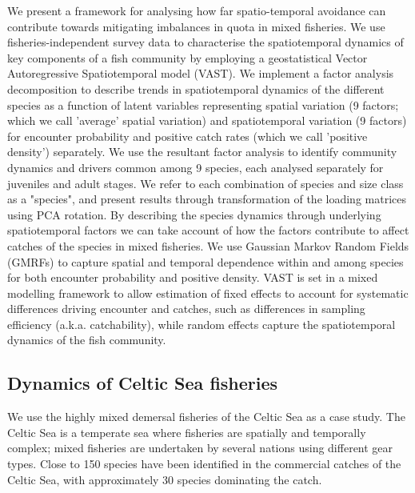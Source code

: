 \documentclass[fleqn,10pt]{wlscirep}
\begin{document}
\begin{linenumbers}
We present a framework for analysing how far spatio-temporal avoidance can
contribute towards mitigating imbalances in quota in mixed fisheries. We use
fisheries-independent survey data to characterise the spatiotemporal dynamics
of key components of a fish community by employing a geostatistical Vector
Autoregressive Spatiotemporal model (VAST). We implement a factor analysis
decomposition to describe trends in spatiotemporal dynamics of the different
species as a function of latent variables\cite{Thorson2015} representing
spatial variation (9 factors; which we call 'average' spatial variation) and
spatiotemporal variation (9 factors) for encounter probability and positive
catch rates (which we call 'positive density') separately\cite{Thorson2015a}.
We use the resultant factor analysis to identify community dynamics and drivers
common among 9 species, each analysed separately for juveniles and adult
stages.  We refer to each combination of species and size class as a
"species", and present results through transformation of
the loading matrices using PCA rotation. By describing the species dynamics
through underlying  spatiotemporal factors we can
take account of how the factors contribute to affect catches of the species in
mixed fisheries.  We use Gaussian Markov Random Fields (GMRFs) to capture
spatial and temporal dependence within and among species for both encounter probability and positive
density\cite{Thorson2013}. VAST is set in a mixed modelling framework to allow
estimation of fixed effects to account for systematic differences driving
encounter and catches, such as differences in sampling efficiency (a.k.a.
catchability), while random effects capture the spatiotemporal dynamics of the
fish community.\\

\subsection*{Dynamics of Celtic Sea fisheries\\}

We use the highly mixed demersal fisheries of the Celtic Sea as a case study.
The Celtic Sea is a temperate sea where fisheries are spatially and temporally
complex; mixed fisheries are undertaken by several nations using different gear
types\cite{Ellis2000, Gerritsen2012}. Close to 150 species have been
identified in the commercial catches of the Celtic Sea, with approximately 30
species dominating the catch\cite{Mateo2016}.\\


\end{linenumbers}
\end{document}

